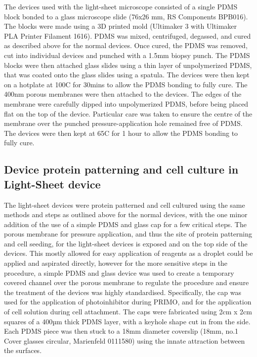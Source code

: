 The devices used with the light-sheet microscope consisted of a single
PDMS block bonded to a glass microscope slide (76x26 mm, RS Components
BPB016). The blocks were made using a 3D printed mold (Ultimaker 3 with
Ultimaker PLA Printer Filament 1616). PDMS was mixed, centrifuged,
degassed, and cured as described above for the normal devices. Once
cured, the PDMS was removed, cut into individual devices and punched
with a 1.5mm biopsy punch. The PDMS blocks were then attached glass
slides using a thin layer of unpolymerized PDMS, that was coated onto
the glass slides using a spatula. The devices were then kept on a
hotplate at 100C for 30mins to allow the PDMS bonding to fully cure. The
400nm porous membranes were then attached to the devices. The edges of
the membrane were carefully dipped into unpolymerized PDMS, before being
placed flat on the top of the device. Particular care was taken to
ensure the centre of the membrane over the punched pressure-application
hole remained free of PDMS. The devices were then kept at 65C for 1 hour
to allow the PDMS bonding to fully cure.

\hypertarget{device-protein-patterning-and-cell-culture-in-light-sheet-device}{%
	\subsection{Device protein patterning and cell culture in Light-Sheet
		device}\label{device-protein-patterning-and-cell-culture-in-light-sheet-device}}

The light-sheet devices were protein patterned and cell cultured using
the same methods and steps as outlined above for the normal devices,
with the one minor addition of the use of a simple PDMS and glass cap
for a few critical steps. The porous membrane for pressure application,
and thus the site of protein patterning and cell seeding, for the
light-sheet devices is exposed and on the top side of the devices. This
mostly allowed for easy application of reagents as a droplet could be
applied and aspirated directly, however for the more sensitive steps in
the procedure, a simple PDMS and glass device was used to create a
temporary covered channel over the porous membrane to regulate the
procedure and ensure the treatment of the devices was highly
standardised. Specifically, the cap was used for the application of
photoinhibitor during PRIMO, and for the application of cell solution
during cell attachment. The caps were fabricated using 2cm x 2cm squares
of a 400µm thick PDMS layer, with a keyhole shape cut in from the side.
Each PDMS piece was then stuck to a 18mm diameter coverslip (18mm, no.1
Cover glasses circular, Marienfeld 0111580) using the innate attraction
between the surfaces.


